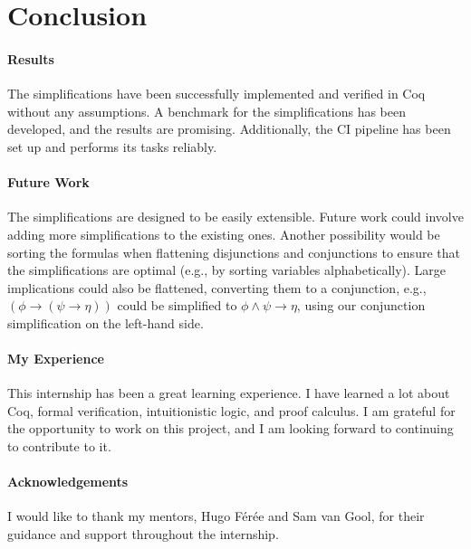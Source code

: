 \documentclass{article}
\begin{document}
\section{Conclusion}

\paragraph{Results}
The simplifications have been successfully implemented and verified in Coq without any assumptions. A benchmark for the simplifications has been developed,
and the results are promising. Additionally, the CI pipeline has been set up and performs its tasks reliably.

\paragraph{Future Work}
The simplifications are designed to be easily extensible. Future work could involve adding more simplifications to the existing ones. Another possibility
would be sorting the formulas when flattening disjunctions and conjunctions to ensure that the simplifications are optimal (e.g., by sorting variables
alphabetically). Large implications could also be flattened, converting them to a conjunction, e.g., $(\phi \rightarrow (\psi \rightarrow \eta))$ could be
simplified to $\phi \wedge \psi \rightarrow \eta$, using our conjunction simplification on the left-hand side.

\paragraph{My Experience}
This internship has been a great learning experience. I have learned a lot about Coq, formal verification, intuitionistic logic, and proof calculus. I am
grateful for the opportunity to work on this project, and I am looking forward to continuing to contribute to it.

\paragraph{Acknowledgements}
I would like to thank my mentors, Hugo Férée and Sam van Gool, for their guidance and support throughout the internship.




\end{document}
